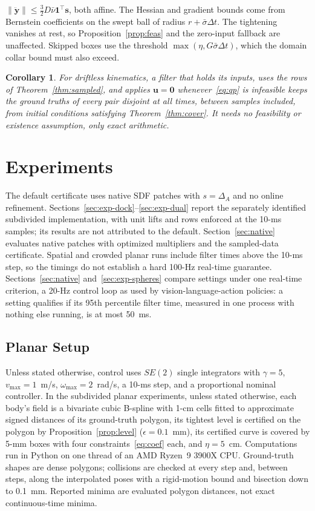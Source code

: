 \documentclass[journal]{IEEEtran}
\newtheorem{corollary}{Corollary}
\theoremstyle{definition}
\newcommand{\norm}[1]{\left\lVert #1\right\rVert}
\begin{document}
$\norm{\ddot{\mathbf y}}\le\frac32D\bar\nu\mathbf1^\top\mathbf s$, both affine. The Hessian and
gradient bounds come from Bernstein coefficients on the swept ball of radius $r+\bar\sigma\Delta t$.
The tightening vanishes at rest, so Proposition~\ref{prop:feas} and the zero-input fallback are
unaffected. Skipped boxes use the threshold $\max(\eta,G\bar\sigma\Delta t)$, which the domain collar
bound must also exceed.
\begin{corollary}\label{cor:sampled}
For driftless kinematics, a filter that holds its inputs, uses the rows of
Theorem~\ref{thm:sampled}, and applies $\mathbf u=\mathbf 0$ whenever~\eqref{eq:qp} is infeasible
keeps the ground truths of every pair disjoint at all times, between samples included, from initial
conditions satisfying Theorem~\ref{thm:cover}. It needs no feasibility or existence assumption,
only exact arithmetic.
\end{corollary}

\section{Experiments}\label{sec:exp}

The default certificate uses native SDF patches with $s=\Delta_A$ and no online refinement.
Sections~\ref{sec:exp-dock}--\ref{sec:exp-dual} report the separately identified subdivided
implementation, with unit lifts and rows enforced at the 10-ms samples; its results are not
attributed to the default. Section~\ref{sec:native} evaluates native patches with optimized
multipliers and the sampled-data certificate. Spatial and crowded planar runs include filter times
above the 10-ms step, so the timings do not establish a hard 100-Hz real-time guarantee.
Sections~\ref{sec:native} and~\ref{sec:exp-spheres} compare settings under one real-time criterion,
a 20-Hz control loop as used by vision-language-action policies: a setting qualifies if its 95th
percentile filter time, measured in one process with nothing else running, is at most 50~ms.

\subsection{Planar Setup}
Unless stated otherwise, control uses $SE(2)$ single integrators with $\gamma=5$,
$v_{\max}=1$~m/s, $\omega_{\max}=2$~rad/s,
a 10-ms step, and a proportional nominal controller. In the subdivided planar experiments,
unless stated otherwise, each body's field is a
bivariate cubic B-spline with 1-cm cells fitted to approximate signed distances of its ground-truth polygon,
its tightest level is certified on the polygon by Proposition~\ref{prop:level} ($\epsilon=0.1$~mm),
its certified curve is covered by 5-mm boxes with four constraints~\eqref{eq:coef} each, and
$\eta=5$~cm. Computations run in Python on one thread of an AMD Ryzen~9 3900X CPU. Ground-truth
shapes are dense polygons; collisions are checked at every step and, between steps, along the
interpolated poses with a rigid-motion bound and bisection down to 0.1~mm.
Reported minima are evaluated polygon distances, not exact continuous-time minima.
\end{document}
